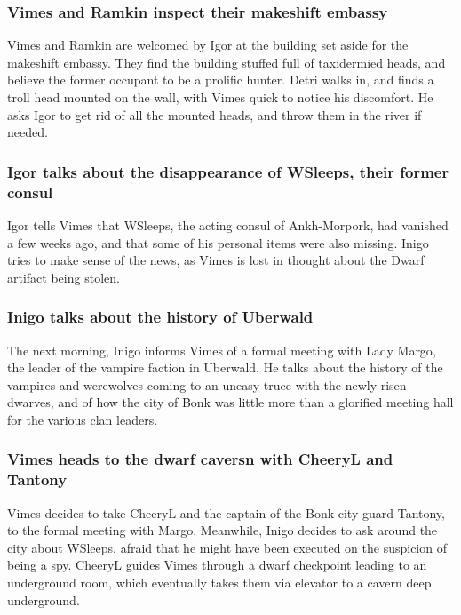 \subsubsection{\Gls{Vimes} and \Gls{Ramkin} inspect their makeshift embassy}
\Gls{Vimes} and \Gls{Ramkin} are welcomed by \Gls{Igor} at the building set aside for the makeshift
embassy. They find the building stuffed full of taxidermied heads, and believe the former occupant
to be a prolific hunter. \Gls{Detri} walks in, and finds a troll head mounted on the wall, with
\Gls{Vimes} quick to notice his discomfort. He asks \Gls{Igor} to get rid of all the mounted heads,
and throw them in the river if needed.

\subsubsection{\Gls{Igor} talks about the disappearance of \Gls{WSleeps}, their former consul}
\Gls{Igor} tells \Gls{Vimes} that \Gls{WSleeps}, the acting consul of Ankh-Morpork, had vanished a
few weeks ago, and that some of his personal items were also missing. \Gls{Inigo} tries to make
sense of the news, as \Gls{Vimes} is lost in thought about the Dwarf artifact being stolen.

\subsubsection{\Gls{Inigo} talks about the history of Uberwald}
The next morning, \Gls{Inigo} informs \Gls{Vimes} of a formal meeting with Lady \Gls{Margo}, the
leader of the vampire faction in Uberwald. He talks about the history of the vampires and werewolves
coming to an uneasy truce with the newly risen dwarves, and of how the city of Bonk was little more
than a glorified meeting hall for the various clan leaders.

\subsubsection{\Gls{Vimes} heads to the dwarf caversn with \Gls{CheeryL} and \Gls{Tantony}}
\Gls{Vimes} decides to take \Gls{CheeryL} and the captain of the Bonk city guard \Gls{Tantony}, to
the formal meeting with \Gls{Margo}. Meanwhile, \Gls{Inigo} decides to ask around the city about
\Gls{WSleeps}, afraid that he might have been executed on the suspicion of being a spy.
\Gls{CheeryL} guides \Gls{Vimes} through a dwarf checkpoint leading to an underground room, which
eventually takes them via elevator to a cavern deep underground.

